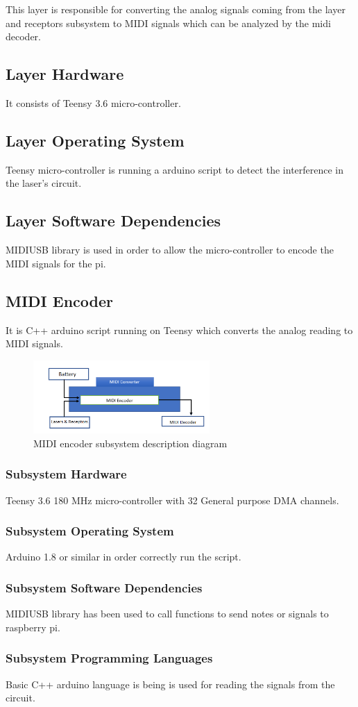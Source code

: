 This layer is responsible for converting the analog signals coming from the layer and receptors subsystem to MIDI signals which can be analyzed by the midi decoder.

\subsection{Layer Hardware}
It consists of Teensy 3.6 micro-controller.

\subsection{Layer Operating System}
Teensy micro-controller is running a arduino script to detect the interference in the laser's circuit.

\subsection{Layer Software Dependencies}
MIDIUSB library is used in order to allow the micro-controller to encode the MIDI signals for the pi.

\subsection{MIDI Encoder}
It is C++ arduino script running on Teensy which converts the analog reading to MIDI signals.

\begin{figure}[h!]
	\centering
 	\includegraphics[width=0.60\textwidth]{images/MIDI.png}
 \caption{ MIDI encoder subsystem description diagram}
\end{figure}

\subsubsection{Subsystem Hardware}
Teensy 3.6 180 MHz micro-controller with 32 General purpose DMA channels.

\subsubsection{Subsystem Operating System}
Arduino 1.8 or similar in order correctly run the script.

\subsubsection{Subsystem Software Dependencies}
MIDIUSB library has been used to call functions to send notes or signals to raspberry pi.

\subsubsection{Subsystem Programming Languages}
Basic C++ arduino language is being is used for reading the signals from the circuit.




